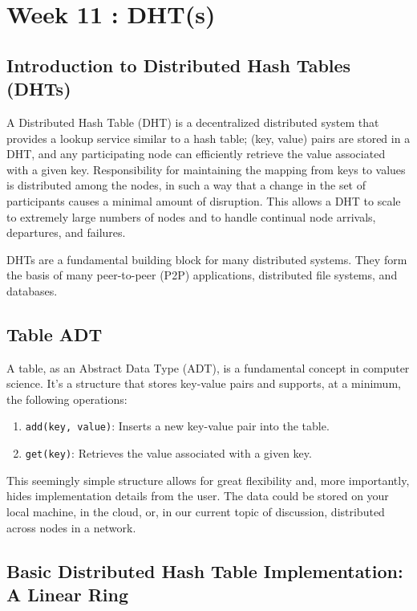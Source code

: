 \section{Week 11 : DHT(s)}
\subsection{Introduction to Distributed Hash Tables (DHTs)}

A Distributed Hash Table (DHT) is a decentralized distributed system that provides a lookup service similar to a hash table; (key, value) pairs are stored in a DHT, and any participating node can efficiently retrieve the value associated with a given key. Responsibility for maintaining the mapping from keys to values is distributed among the nodes, in such a way that a change in the set of participants causes a minimal amount of disruption. This allows a DHT to scale to extremely large numbers of nodes and to handle continual node arrivals, departures, and failures.

DHTs are a fundamental building block for many distributed systems. They form the basis of many peer-to-peer (P2P) applications, distributed file systems, and databases.

\subsection{Table ADT}

A table, as an Abstract Data Type (ADT), is a fundamental concept in computer science. It's a structure that stores key-value pairs and supports, at a minimum, the following operations:

\begin{enumerate}[itemsep=1pt, topsep=1pt]
    \item \texttt{add(key, value)}: Inserts a new key-value pair into the table.
    \item \texttt{get(key)}: Retrieves the value associated with a given key.
\end{enumerate}

This seemingly simple structure allows for great flexibility and, more importantly, hides implementation details from the user. The data could be stored on your local machine, in the cloud, or, in our current topic of discussion, distributed across nodes in a network.

\subsection{Basic Distributed Hash Table Implementation: A Linear Ring}

